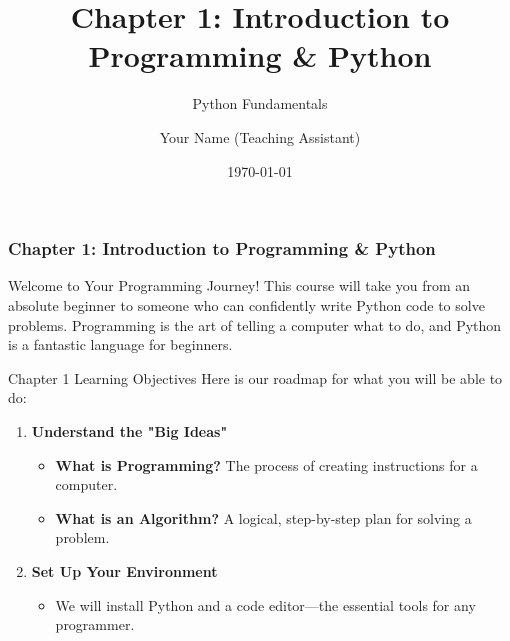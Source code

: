 \documentclass{beamer}
\title{Chapter 1: Introduction to Programming \& Python}
\subtitle{Python Fundamentals}
\author{Your Name (Teaching Assistant)}
\institute{Your Institution}
\date{\today}
\begin{document}
\frame{\titlepage}

\begin{frame}[fragile]
    \frametitle{Chapter 1: Introduction to Programming \& Python}

    \begin{block}{Welcome to Your Programming Journey!}
        This course will take you from an absolute beginner to someone who can confidently write Python code to solve problems. Programming is the art of telling a computer what to do, and Python is a fantastic language for beginners.
    \end{block}

    \vspace{1em}

    \begin{block}{Chapter 1 Learning Objectives}
        Here is our roadmap for what you will be able to do:
        \begin{enumerate}
            \item \textbf{Understand the "Big Ideas"}
            \begin{itemize}
                \item \textbf{What is Programming?} The process of creating instructions for a computer.
                \item \textbf{What is an Algorithm?} A logical, step-by-step plan for solving a problem.
            \end{itemize}
            \item \textbf{Set Up Your Environment}
            \begin{itemize}
                \item We will install Python and a code editor---the essential tools for any programmer.
            \end{itemize}
        \end{enumerate}
    \end{block}
\end{frame}
\end{document}
